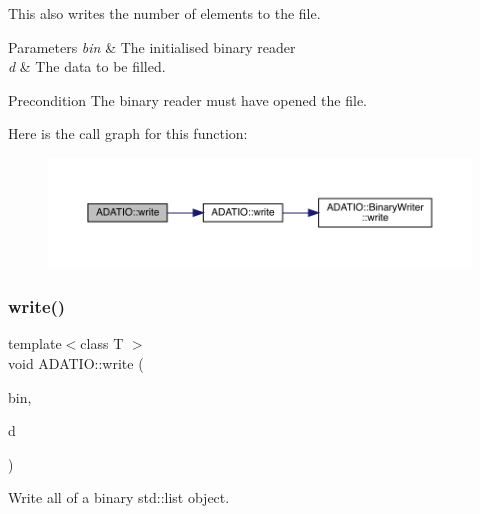 This also writes the number of elements to the file. 
\begin{DoxyParams}{Parameters}
{\em bin} & The initialised binary reader \\
\hline
{\em d} & The data to be filled.\\
\hline
\end{DoxyParams}
\begin{DoxyPrecond}{Precondition}
The binary reader must have opened the file. 
\end{DoxyPrecond}
Here is the call graph for this function\+:
\nopagebreak
\begin{figure}[H]
\begin{center}
\leavevmode
\includegraphics[width=350pt]{d0/dba/namespaceADATIO_a588c700d58adcb2b77399ac18ec9226b_cgraph}
\end{center}
\end{figure}
\mbox{\label{namespaceADATIO_a940fb003df0f6107d020341f78592201}} 
\subsubsection{\texorpdfstring{write()}{write()}\hspace{0.1cm}{\footnotesize\ttfamily [22/25]}}
{\footnotesize\ttfamily template$<$class T $>$ \\
void A\+D\+A\+T\+I\+O\+::write (\begin{DoxyParamCaption}\item[{\mbox{\hyperlink{classADATIO_1_1BinaryWriter}{Binary\+Writer}} \&}]{bin,  }\item[{const std\+::list$<$ T $>$ \&}]{d }\end{DoxyParamCaption})\hspace{0.3cm}{\ttfamily [inline]}}



Write all of a binary std\+::list object. 


